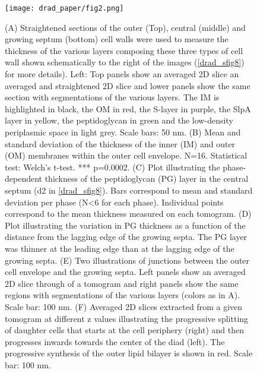 \begin{figure}[ht]
    \centering
    \texttt{[image: drad\_paper/fig2.png]}
    \label{drad_fig2}
\end{figure}
\begin{figure}[ht]
    \ContinuedFloat
    \caption[]{(A) Straightened sections of the outer (Top), central (middle) and growing septum (bottom) cell walls were used to measure the thickness of the various layers composing these three types of cell wall shown schematically to the right of the images (\autoref{drad_sfig8}) for more details). Left: Top panels show an averaged 2D slice an averaged and straightened 2D slice and lower panels show the same section with segmentations of the various layers. The IM is highlighted in black, the OM in red, the S-layer in purple, the SlpA layer in yellow, the peptidoglycan in green and the low-density periplasmic space in light grey. Scale bars: 50 nm. (B) Mean and standard deviation of the thickness of the inner (IM) and outer (OM) membranes within the outer cell envelope. N=16. Statistical test: Welch's t-test. *** p=0.0002. (C) Plot illustrating the phase-dependent thickness of the peptidoglycan (PG) layer in the central septum (d2 in \autoref{drad_sfig8}). Bars correspond to mean and standard deviation per phase (N<6 for each phase). Individual points correspond to the mean thickness measured on each tomogram. (D) Plot illustrating the variation in PG thickness as a function of the distance from the lagging edge of the growing septa. The PG layer was thinner at the leading edge than at the lagging edge of the growing septa. (E) Two illustrations of junctions between the outer cell envelope and the growing septa. Left panels show an averaged 2D slice through of a tomogram and right panels show the same regions with segmentations of the various layers (colors as in A). Scale bar: 100 nm. (F) Averaged 2D slices extracted from a given tomogram at different z values illustrating the progressive splitting of daughter cells that starts at the cell periphery (right) and then progresses inwards towards the center of the diad (left). The progressive synthesis of the outer lipid bilayer is shown in red. Scale bar: 100 nm.}
\end{figure}

